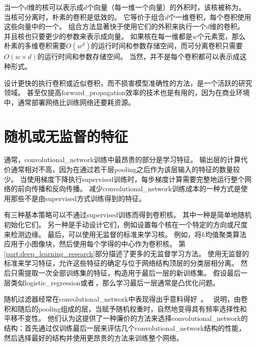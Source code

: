 当一个$d$维的核可以表示成$d$个向量（每一维一个向量）的外积时，该核被称为。
当核可分离时，朴素的卷积是低效的。
它等价于组合$d$个一维卷积，每个卷积使用这些向量中的一个。
组合方法显著快于使用它们的外积来执行一个$d$维的卷积。
并且核也只要更少的参数来表示成向量。
如果核在每一维都是$w$个元素宽，那么朴素的多维卷积需要$O(w^d)$的运行时间和参数存储空间，而可分离卷积只需要$O(w\times d)$的运行时间和参数存储空间。
当然，并不是每个卷积都可以表示成这种形式。

设计更快的执行卷积或近似卷积，而不损害模型准确性的方法，是一个活跃的研究领域。 
甚至仅提高\gls{forward_propagation}效率的技术也是有用的，因为在商业环境中，通常部署网络比训练网络还要耗资源。

\section{随机或无监督的特征}
\label{sec:random_or_unsupervised_features}

通常，\gls{convolutional_network}训练中最昂贵的部分是学习特征。 
输出层的计算代价通常相对不高，因为在通过若干层\gls{pooling}之后作为该层输入的特征的数量较少。
当使用梯度下降执行\gls{supervised}训练时，每步梯度计算需要完整地运行整个网络的前向传播和反向传播。
减少\gls{convolutional_network}训练成本的一种方式是使用那些不是由\gls{supervised}方式训练得到的特征。

有三种基本策略可以不通过\gls{supervised}训练而得到卷积核。
其中一种是简单地随机初始化它们。
另一种是手动设计它们，例如设置每个核在一个特定的方向或尺度来检测边缘。
最后，可以使用无监督的标准来学习核。
例如，\cite{Coates2011}将$k$均值聚类算法应用于小图像块，然后使用每个学得的中心作为卷积核。
第\ref{part:deep_learning_research}部分描述了更多的无监督学习方法。
使用无监督的标准来学习特征，允许这些特征的确定与位于网络结构顶层的分类层相分离。
然后只需提取一次全部训练集的特征，构造用于最后一层的新训练集。
假设最后一层类似\gls{logistic_regression}或者\,，那么学习最后一层通常是凸优化问题。

 
 
随机过滤器经常在\gls{convolutional_network}中表现得出乎意料得好~\cite{Jarrett-ICCV2009-small,Saxe-ICML2011,pinto2011scaling,cox2011beyond}。
\cite{Saxe-ICML2011}~说明，由卷积和随后的\gls{pooling}组成的层，当赋予随机权重时，自然地变得具有频率选择性和平移不变性。
他们认为这提供了一种廉价的方法来选择\gls{convolutional_network}的结构：首先通过仅训练最后一层来评估几个\gls{convolutional_network}结构的性能，然后选择最好的结构并使用更昂贵的方法来训练整个网络。

